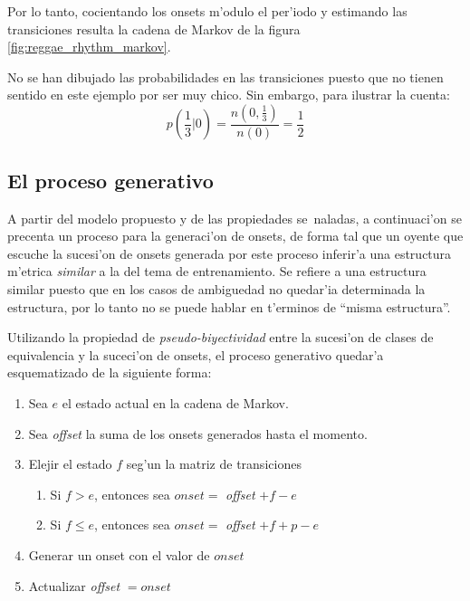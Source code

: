 Por lo tanto, cocientando los onsets m'odulo el per'iodo y estimando las transiciones resulta la cadena de Markov de la figura \ref{fig:reggae_rhythm_markov}.
\begin{imagen}
\end{imagen}

No se han dibujado las probabilidades en las transiciones puesto que no tienen sentido en este ejemplo por ser muy chico. Sin embargo, para ilustrar la cuenta:
$$p(\frac{1}{3}|0) = \frac{n(0, \frac{1}{3})}{n(0)} = \frac{1}{2}$$

\subsection{El proceso generativo}
A partir del modelo propuesto y de las propiedades se~naladas, a continuaci'on se precenta un proceso para la generaci'on de onsets, de forma tal 
que un oyente que escuche la sucesi'on de onsets generada por este proceso inferir'a una estructura m'etrica \emph{similar} a la del tema de 
entrenamiento. Se refiere a una estructura similar puesto que en los casos de ambiguedad no quedar'ia determinada la estructura, por lo tanto
no se puede hablar en t'erminos de ``misma estructura''.

Utilizando la propiedad de \emph{pseudo-biyectividad} entre la sucesi'on de clases de equivalencia y la suceci'on de onsets, 
el proceso generativo quedar'a esquematizado de la siguiente forma:

\begin{enumerate}
  \item Sea $e$ el estado actual en la cadena de Markov. 
  \item Sea \emph{offset} la suma de los onsets generados hasta el momento. 
  \item Elejir el estado $f$ seg'un la matriz de transiciones
  \begin{enumerate}
    \item Si $f > e$, entonces sea $onset=$ \emph{offset} $+ f-e$
    \item Si $f \leq e$, entonces sea $onset=$ \emph{offset} $+ f + p - e$
  \end{enumerate}
  \item Generar un onset con el valor de $onset$
  \item Actualizar \emph{offset} $= onset$
\end{enumerate}

